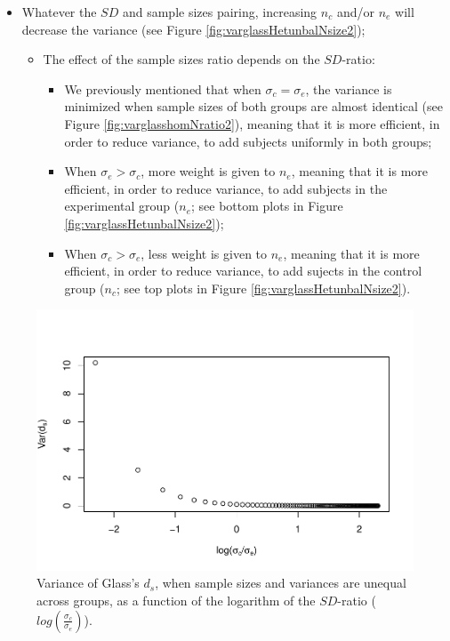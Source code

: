 \documentclass[
  english,
  man]{apa6}
\providecommand{\tightlist}{%
  \setlength{\itemsep}{0pt}\setlength{\parskip}{0pt}}
\begin{document}
\begin{itemize}
\item
  Whatever the \(SD\) and sample sizes pairing, increasing \(n_c\) and/or \(n_e\) will decrease the variance (see Figure \ref{fig:varglassHetunbalNsize2});

  \begin{itemize}
  \tightlist
  \item
    The effect of the sample sizes ratio depends on the \(SD\)-ratio:

    \begin{itemize}
    \tightlist
    \item
      We previously mentioned that when \(\sigma_c=\sigma_e\), the variance is minimized when sample sizes of both groups are almost identical (see Figure \ref{fig:varglasshomNratio2}), meaning that it is more efficient, in order to reduce variance, to add subjects uniformly in both groups;\\
    \item
      When \(\sigma_e > \sigma_c\), more weight is given to \(n_e\), meaning that it is more efficient, in order to reduce variance, to add subjects in the experimental group (\(n_e\); see bottom plots in Figure \ref{fig:varglassHetunbalNsize2});\\
    \item
      When \(\sigma_c > \sigma_e\), less weight is given to \(n_e\), meaning that it is more efficient, in order to reduce variance, to add sujects in the control group (\(n_c\); see top plots in Figure \ref{fig:varglassHetunbalNsize2}).
    \end{itemize}
  \end{itemize}
\end{itemize}

\begin{figure}
\centering
\includegraphics{Theoretical-Variance-of-all-estimators-as-a-function-of-population-parameters_files/figure-latex/varglasshetunbalSDratio2-1.pdf}
\caption{\label{fig:varglasshetunbalSDratio2}Variance of Glass's \(d_s\), when sample sizes and variances are unequal across groups, as a function of the logarithm of the \(SD\)-ratio (\(log \left( \frac{\sigma_c}{\sigma_e} \right)\)).}
\end{figure}
\end{document}
